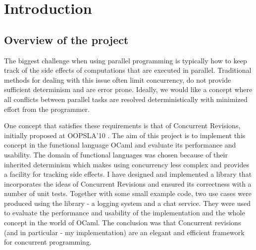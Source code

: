 \documentclass[12pt,twoside,notitlepage]{report}
\begin{document}
\bigskip
{}

\medskip
{}

\cleardoublepage

\tableofcontents

\listoffigures

 


\cleardoublepage        %

\setcounter{page}{1}
\pagestyle{headings}

\chapter{Introduction}

\section{Overview of the project}
The biggest challenge when using parallel programming is typically how to keep track of the side effects of computations that are executed in parallel. Traditional methods for dealing with this issue often limit concurrency, do not provide sufficient determinism and are error prone. Ideally, we would like a concept where all conflicts between parallel tasks are resolved deterministically with minimized effort from the programmer. 

One concept that satisfies these requirements is that of Concurrent Revisions, initially proposed at OOPSLA'10 \cite{conrev}. The aim of this project is to implement this concept in the functional language OCaml and evaluate its performance and usability. The domain of functional languages was chosen because of their inherited determinism which makes using concurrency less complex and provides a facility for tracking side effects. I have designed and implemented a library that incorporates the ideas of Concurrent Revisions and ensured its correctness with a number of unit tests. Together with some small example code, two use cases were produced using the library - a logging system and a chat service. They were used to evaluate the performance and usability of the implementation and the whole concept in the world of OCaml. The conclusion was that Concurrent revisions (and in particular - my implementation) are an elegant and efficient framework for concurrent programming.
\end{document}
